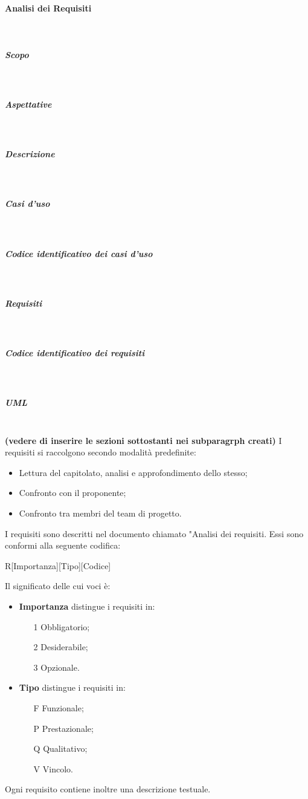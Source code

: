 \paragraph{Analisi dei Requisiti} \mbox{}\\
\subparagraph{Scopo} \mbox{}\\
\subparagraph{Aspettative} \mbox{}\\
\subparagraph{Descrizione} \mbox{}\\
\subparagraph{Casi d'uso} \mbox{}\\
\subparagraph{Codice identificativo dei casi d'uso} \mbox{}\\
\subparagraph{Requisiti} \mbox{}\\
\subparagraph{Codice identificativo dei requisiti} \mbox{}\\
\subparagraph{UML} \mbox{}\\
\textbf{(vedere di inserire le sezioni sottostanti nei subparagrph creati)}
I requisiti si raccolgono secondo modalità predefinite:
\begin{itemize}
	\item Lettura del capitolato, analisi e approfondimento dello stesso;
	\item Confronto con il proponente;
	\item Confronto tra membri del team di progetto.
\end{itemize}
I requisiti sono descritti nel documento chiamato "Analisi dei
requisiti. Essi sono conformi alla seguente codifica:\newline
\centerline{R[Importanza][Tipo][Codice]}\newline
Il significato delle cui voci è:
\begin{itemize}
	\item \textbf{Importanza} distingue i requisiti in:
	\begin{itemize}
		\item[1] Obbligatorio;
		\item[2] Desiderabile;
		\item[3] Opzionale.
	\end{itemize}
	\item \textbf{Tipo} distingue i requisiti in:
	\begin{itemize}
		\item[F] Funzionale;
		\item[P] Prestazionale;
		\item[Q] Qualitativo;
		\item[V] Vincolo.
	\end{itemize}
\end{itemize}
Ogni requisito contiene inoltre una descrizione testuale.
